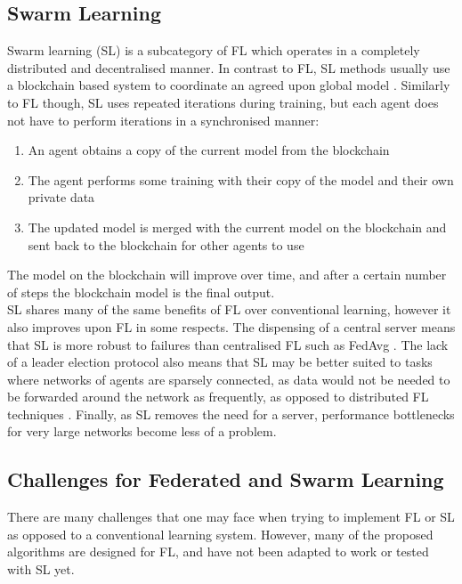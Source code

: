 \subsection{Swarm Learning}
Swarm learning (SL) \cite{swarm_learning} is a subcategory of FL which operates in a completely distributed and decentralised manner. In contrast to FL, SL methods usually use a blockchain based system to coordinate an agreed upon global model \citeme. Similarly to FL though, SL uses repeated iterations during training, but each agent does not have to perform iterations in a synchronised manner:
\begin{enumerate}
	\item An agent obtains a copy of the current model from the blockchain
	\item The agent performs some training with their copy of the model and their own private data
	\item The updated model is merged with the current model on the blockchain and sent back to the blockchain for other agents to use
\end{enumerate}
The model on the blockchain will improve over time, and after a certain number of steps the blockchain model is the final output. \\

SL shares many of the same benefits of FL over conventional learning, however it also improves upon FL in some respects. The dispensing of a central server means that SL is more robust to failures than centralised FL such as FedAvg \citeme. The lack of a leader election protocol also means that SL may be better suited to tasks where networks of agents are sparsely connected, as data would not be needed to be forwarded around the network as frequently, as opposed to distributed FL techniques \citeme. Finally, as SL removes the need for a server, performance bottlenecks for very large networks become less of a problem.

\subsection{Challenges for Federated and Swarm Learning}
There are many challenges that one may face when trying to implement FL or SL as opposed to a conventional learning system. However, many of the proposed algorithms are designed for FL, and have not been adapted to work or tested with SL yet.


